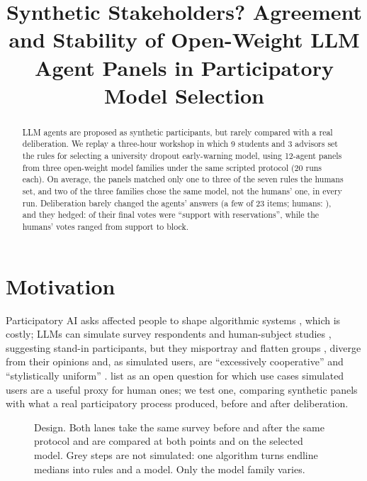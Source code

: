 \documentclass[11pt,a4paper]{article}
\title[Synthetic Stakeholders?]{Synthetic Stakeholders? Agreement and Stability of Open-Weight LLM Agent Panels in Participatory Model Selection}
\begin{document}
\maketitle

\begin{abstract}
LLM agents are proposed as synthetic participants, but rarely compared with a real deliberation.
We replay a three-hour workshop in which 9 students and 3 advisors set the rules for selecting a university dropout early-warning model, using 12-agent panels from three open-weight model families under the same scripted protocol (20 runs each).
On average, the panels matched only one to three of the seven rules the humans set, and two of the three families chose the same model, not the humans' one, in every run.
Deliberation barely changed the agents' answers (a few of 23 items; humans: \humanShiftItems{}), and they hedged: \reservationsFull{} of their final votes were ``support with reservations'', while the humans' votes ranged from support to block.
\end{abstract}

\section{Motivation}
Participatory AI asks affected people to shape algorithmic systems \citep{birhanePowerPeopleOpportunities2022,delgadoParticipatoryTurnAI2023}, which is costly; LLMs can simulate survey respondents and human-subject studies \citep{argyle2023outofone,aher2023using}, suggesting stand-in participants, but they misportray and flatten groups \citep{wang2025misportray}, diverge from their opinions \citep{santurkar2023whose} and, as simulated users, are ``excessively cooperative'' and ``stylistically uniform'' \citep{zhou2026sim2real}.
\citet{chen2026trends} list as an open question for which use cases simulated users are a useful proxy for human ones; we test one, comparing synthetic panels with what a real participatory process produced, before and after deliberation.

\begin{figure}[b]
  \centering
  
  \caption{Design. Both lanes take the same survey before and after the same protocol and are compared at both points and on the selected model. Grey steps are not simulated: one algorithm turns endline medians into rules and a model. Only the model family varies.}
  \label{fig:design}
\end{figure}
\end{document}
